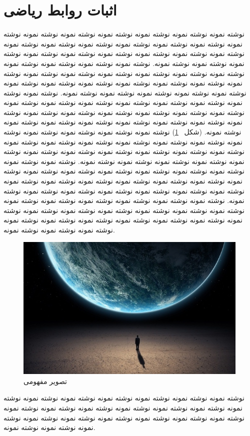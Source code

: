 \section{اثبات روابط ریاضی}
نوشته نمونه نوشته نمونه نوشته نمونه نوشته نمونه نوشته نمونه نوشته نمونه نوشته نمونه نوشته نمونه نوشته نمونه نوشته نمونه نوشته نمونه نوشته نمونه نوشته نمونه نوشته نمونه نوشته نمونه نوشته نمونه نوشته نمونه نوشته نمونه نوشته نمونه نوشته نمونه نوشته نمونه نوشته نمونه. نوشته نمونه نوشته نمونه نوشته نمونه نوشته نمونه نوشته نمونه نوشته نمونه نوشته نمونه نوشته نمونه نوشته نمونه نوشته نمونه نوشته نمونه نوشته نمونه نوشته نمونه نوشته نمونه نوشته نمونه نوشته نمونه نوشته نمونه نوشته نمونه نوشته نمونه نوشته نمونه نوشته نمونه نوشته نمونه. نوشته نمونه نوشته نمونه نوشته نمونه نوشته نمونه نوشته نمونه نوشته نمونه نوشته نمونه نوشته نمونه نوشته نمونه نوشته نمونه نوشته نمونه نوشته نمونه نوشته نمونه نوشته نمونه نوشته نمونه نوشته نمونه نوشته نمونه نوشته نمونه نوشته نمونه نوشته نمونه نوشته نمونه نوشته نمونه. (شکل~%
\ref{Fig:World1})
نوشته نمونه نوشته نمونه نوشته نمونه نوشته نمونه نوشته نمونه نوشته نمونه نوشته نمونه نوشته نمونه نوشته نمونه نوشته نمونه نوشته نمونه نوشته نمونه نوشته نمونه نوشته نمونه نوشته نمونه نوشته نمونه نوشته نمونه نوشته نمونه نوشته نمونه نوشته نمونه نوشته نمونه نوشته نمونه. نوشته نمونه نوشته نمونه نوشته نمونه نوشته نمونه نوشته نمونه نوشته نمونه نوشته نمونه نوشته نمونه نوشته نمونه نوشته نمونه نوشته نمونه نوشته نمونه نوشته نمونه نوشته نمونه نوشته نمونه نوشته نمونه نوشته نمونه نوشته نمونه نوشته نمونه نوشته نمونه نوشته نمونه نوشته نمونه. نوشته نمونه نوشته نمونه نوشته نمونه نوشته نمونه نوشته نمونه نوشته نمونه نوشته نمونه نوشته نمونه نوشته نمونه نوشته نمونه نوشته نمونه نوشته نمونه نوشته نمونه نوشته نمونه نوشته نمونه نوشته نمونه نوشته نمونه نوشته نمونه نوشته نمونه نوشته نمونه نوشته نمونه نوشته نمونه.
\begin{figure}[!htb]
\centering
\includegraphics[scale=0.4]{Figures/World.jpg}
\caption{تصویر مفهومی}
\label{Fig:World1}
\end{figure}

نوشته نمونه نوشته نمونه نوشته نمونه نوشته نمونه نوشته نمونه نوشته نمونه نوشته نمونه نوشته نمونه نوشته نمونه نوشته نمونه نوشته نمونه نوشته نمونه نوشته نمونه نوشته نمونه نوشته نمونه نوشته نمونه نوشته نمونه نوشته نمونه نوشته نمونه نوشته نمونه نوشته نمونه نوشته نمونه.